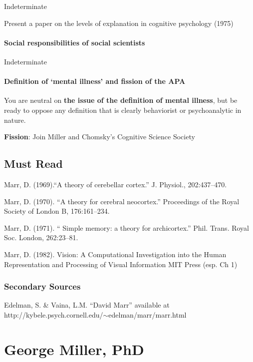 \begin{refsection}
Indeterminate
\begin{writingtask}[Marr]\label{writingtask:marr}
Present a paper on the levels of explanation in cognitive psychology (1975)
\end{writingtask}

\subsubsection{Social responsibilities of social scientists}
\label{socialresponsibilitiesofsocialscientists}

Indeterminate

\subsubsection{Definition of ‘mental illness’ and fission of the APA}
\label{definitionof‘mentalillness’andfissionoftheapa}

You are neutral on \textbf{the issue of the definition of mental illness}, but be ready to oppose any definition that is clearly behaviorist or psychoanalytic in nature.

\textbf{Fission}: Join Miller and Chomsky's Cognitive Science Society

\section{Must Read}
\label{mustread}

Marr, D. (1969).“A theory of cerebellar cortex.” J. Physiol., 202:437--470.

Marr, D. (1970). “A theory for cerebral neocortex.” Proceedings of the Royal Society of London B, 176:161--234.

Marr, D. (1971). “ Simple memory: a theory for archicortex.” Phil. Trans. Royal Soc. London, 262:23--81.

Marr, D. (1982). Vision: A Computational Investigation into the Human Representation and Processing of Visual Information MIT Press (esp. Ch 1)

\subsection{Secondary Sources}
\label{secondarysources}

Edelman, S. \& Vaina, L.M. “David Marr” available at http:\slash \slash kybele.psych.cornell.edu\slash \ensuremath{\sim}edelman\slash marr\slash marr.html

\chapter{George Miller, PhD}
\label{georgemillerphd}


\end{refsection}
